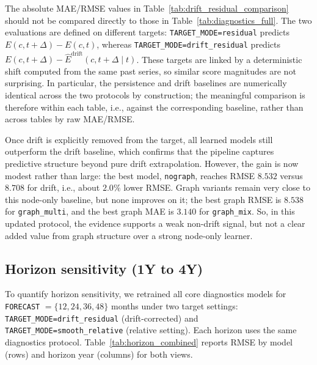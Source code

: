\documentclass{article}
\begin{document}
The absolute MAE/RMSE values in Table~\ref{tab:drift_residual_comparison} should not be compared directly to those in Table~\ref{tab:diagnostics_full}.
The two evaluations are defined on different targets: \texttt{TARGET\_MODE=residual} predicts
\(E(c,t+\Delta)-E(c,t)\), whereas \texttt{TARGET\_MODE=drift\_residual} predicts
\(E(c,t+\Delta)-\widehat{E}^{\text{drift}}(c,t+\Delta \mid t)\).
These targets are linked by a deterministic shift computed from the same past series, so similar score magnitudes are not surprising.
In particular, the persistence and drift baselines are numerically identical across the two protocols by construction; the meaningful comparison is therefore within each table, i.e., against the corresponding baseline, rather than across tables by raw MAE/RMSE.

Once drift is explicitly removed from the target, all learned models still outperform the drift baseline,
which confirms that the pipeline captures predictive structure beyond pure drift extrapolation.
However, the gain is now modest rather than large: the best model, \texttt{nograph}, reaches
RMSE \(8.532\) versus \(8.708\) for drift, i.e., about \(2.0\%\) lower RMSE.
Graph variants remain very close to this node-only baseline, but none improves on it; the best graph
RMSE is \(8.538\) for \texttt{graph\_multi}, and the best graph MAE is \(3.140\) for \texttt{graph\_mix}.
So, in this updated protocol, the evidence supports a weak non-drift signal, but not a clear added value
from graph structure over a strong node-only learner.

\subsection{Horizon sensitivity (1Y to 4Y)}
To quantify horizon sensitivity, we retrained all core diagnostics models for \texttt{FORECAST} \(=\{12,24,36,48\}\) months under two target settings:
\texttt{TARGET\_MODE=drift\_residual} (drift-corrected) and
\texttt{TARGET\_MODE=smooth\_relative} (relative setting).
Each horizon uses the same diagnostics protocol. Table~\ref{tab:horizon_combined}
reports RMSE by model (rows) and horizon year (columns) for both views.
\end{document}
